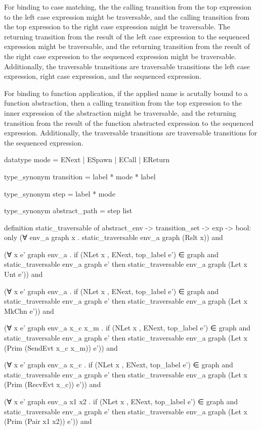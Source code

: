 For binding to case matching, the the calling transition from the top expression to the left
case expression might be traversable, and the calling transition from the top expression to the
right case expression might be traversable.  The returning transition from the result of the
left case expression to the sequenced expression might be traversable, and the returning
transition from the result of the right case expression to the sequenced expression might be
traversable.  Additionally, the traversable transitions are traversable transitions the left
case expression, right case expression, and the sequenced expression.   

For binding to function application, if the applied name is acutally bound to a function
abstraction, then a calling transition from the top expression to the inner expression of the
abstraction might be traversable, and the returning transition from the result of the function
abstracted expression to the sequenced expression.  Additionally, the traversable transitions
are traversable transitions for the sequenced expression. 

datatype mode = ENext | ESpawn | ECall | EReturn

type_synonym transition = label * mode * label

type_synonym step = label * mode

type_synonym abstract_path = step list


definition static_traversable of abstract_env -> transition_set -> exp -> bool:
only
(∀ env_a graph x .
    static_traversable env_a graph (Rslt x)) and

(∀ x e' graph env_a  .
  if
    (NLet x , ENext, top_label e') ∈ graph and
    static_traversable env_a graph e'
  then
    static_traversable env_a graph (Let x Unt e')) and

(∀ x e' graph env_a  .
  if
    (NLet x , ENext, top_label e') ∈ graph and
    static_traversable env_a graph e'
  then
    static_traversable env_a graph (Let x MkChn e')) and


(∀ x e' graph env_a  x_c x_m .
  if
    (NLet x , ENext, top_label e') ∈ graph and
    static_traversable env_a graph e'
  then
    static_traversable env_a graph (Let x (Prim (SendEvt x_c x_m)) e')) and

(∀ x e' graph env_a x_c .
  if
    (NLet x , ENext, top_label e') ∈ graph and
    static_traversable env_a graph e'
  then
    static_traversable env_a graph (Let x (Prim (RecvEvt x_c)) e')) and


(∀ x e' graph env_a x1 x2 .
  if
    (NLet x , ENext, top_label e') ∈ graph and
    static_traversable env_a graph e'
  then
    static_traversable env_a graph (Let x (Prim (Pair x1 x2)) e')) and


